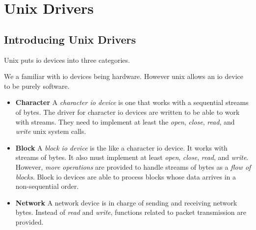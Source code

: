 
\chapter{Unix Drivers}


\section{Introducing Unix Drivers}

Unix puts io devices into three categories.


\begin{figure}[h]
\end{figure}

We a familiar with io devices being hardware.
However unix allows an io device to be purely software. 


\begin{itemize}   
\renewcommand{\labelitemi}{$\Box$}
\item \textbf{Character} 
A \textit{character io device} is one that works with a sequential streams of bytes. 
The driver for character io devices are written to be able to work with streams.
They need to implement at least the \textit{open}, \textit{close}, \textit{read}, and 
\textit{write} unix system calls. 
\item \textbf{Block} 
A \textit{block io device} is the like a character io device. 
It works with streams of bytes. It also must implement at least \textit{open}, \textit{close}, \textit{read}, and \textit{write}. However, \textit{more operations} are provided to handle streams of bytes as a \textit{flow of blocks}. Block io devices are 
able to process blocks whose data arrives in a non-sequential order.
\item \textbf{Network} 
A network device is in charge of sending and receiving network bytes.
Instead of \textit{read} and \textit{write}, functions
related to packet transmission are provided.
\end{itemize}

